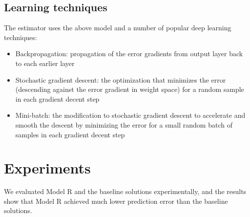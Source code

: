 \documentclass[sigconf]{acmart}
\begin{document}
\subsection{Learning techniques}
The estimator uses the above model and a number of popular deep learning 
techniques:
\begin{itemize}
	\item Backpropagation: propagation of the error gradients from output layer 
	back to each earlier layer \cite{rumelhart1988learning}
	\item Stochastic gradient descent: the optimization that minimizes 
	the error (descending against the error gradient in weight space) for a 
	random sample in each gradient decent step \cite{lecun2012efficient}
	\item Mini-batch: the modification to stochastic gradient descent to 
	accelerate and smooth the descent by minimizing the error for a small 
	random batch of samples in each gradient decent step \cite{mairal2010online}
\end{itemize}

\section{Experiments}
We evaluated Model R and the baseline solutions experimentally,
and the results show that Model R achieved much lower prediction error than 
the baseline solutions.
\end{document}
